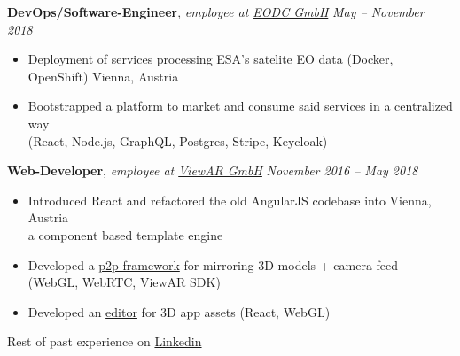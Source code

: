 \documentclass[9pt]{extarticle}
\begin{document}
\noindent
{\bf DevOps/Software-Engineer}, \textit{employee at \href{https://eodc.eu}{EODC GmbH}}  \hfill \textit{May -- November 2018}
\begin{itemize}
\setlength\itemsep{0.05em}
    \item Deployment of services processing ESA's satelite EO data (Docker, OpenShift) \hfill Vienna, Austria
    \item Bootstrapped a platform to market and consume said services in a centralized way \\
    (React, Node.js, GraphQL, Postgres, Stripe, Keycloak) \\
\end{itemize}

\noindent
{\bf Web-Developer}, \textit{employee at \href{https://viewar.com}{ViewAR GmbH}}  \hfill \textit{November 2016 -- May 2018}
\begin{itemize}
\setlength\itemsep{0.05em}
    \item Introduced React and refactored the old AngularJS codebase into \hfill Vienna, Austria \\
    a component based template engine
    \item Developed a \href{https://www.youtube.com/watch?v=0j-v-j9xEUQ}{p2p-framework} for mirroring 3D models + camera feed \\
    (WebGL, WebRTC, ViewAR SDK)
    \item Developed an \href{https://www.youtube.com/watch?v=quE-erJ4PmU&t=113s}{editor} for 3D app assets (React, WebGL) \\
\end{itemize}

\noindent
Rest of past experience on \href{https://linkedin.com/in/jonas-laux-2aaaa8105}{Linkedin} \\


\end{document}
